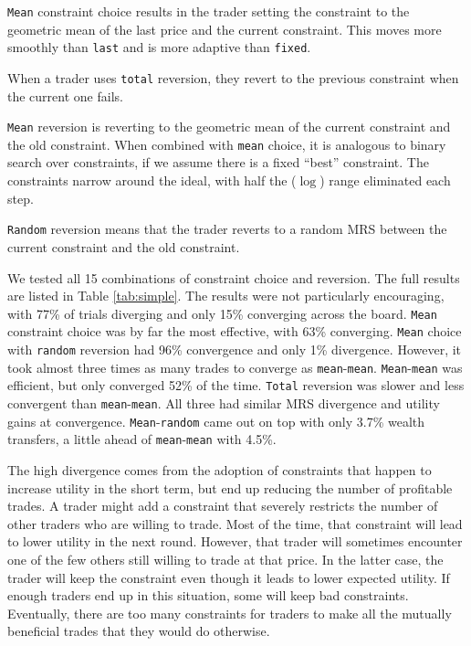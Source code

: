 \documentclass[12pt,a4paper,titlepage]{article}
\newcommand{\co}[1]{\texttt{#1}}
\begin{document}
\co{Mean} constraint choice results in the trader setting the constraint to the geometric mean of the last price and the current constraint.
This moves more smoothly than \co{last} and is more adaptive than \co{fixed}.

When a trader uses \co{total} reversion, they revert to the previous constraint when the current one fails.

\co{Mean} reversion is reverting to the geometric mean of the current constraint and the old constraint.
When combined with \co{mean} choice, it is analogous to binary search over constraints, if we assume there is a fixed ``best'' constraint.
The constraints narrow around the ideal, with half the ($\log$) range eliminated each step.

\co{Random} reversion means that the trader reverts to a random MRS between the current constraint and the old constraint.

We tested all 15 combinations of constraint choice and reversion.
The full results are listed in Table \ref{tab:simple}.
The results were not particularly encouraging, with 77\% of trials diverging and only 15\% converging across the board.
\co{Mean} constraint choice was by far the most effective, with 63\% converging.
\co{Mean} choice with \co{random} reversion had 96\% convergence and only 1\% divergence.
However, it took almost three times as many trades to converge as \co{mean}-\co{mean}.
\co{Mean}-\co{mean} was efficient, but only converged 52\% of the time.
\co{Total} reversion was slower and less convergent than \co{mean}-\co{mean}.
All three had similar MRS divergence and utility gains at convergence.
\co{Mean}-\co{random} came out on top with only 3.7\% wealth transfers, a little ahead of \co{mean}-\co{mean} with 4.5\%.

The high divergence comes from the adoption of constraints that happen to increase utility in the short term, but end up reducing the number of profitable trades.
A trader might add a constraint that severely restricts the number of other traders who are willing to trade.
Most of the time, that constraint will lead to lower utility in the next round.
However, that trader will sometimes encounter one of the few others still willing to trade at that price.
In the latter case, the trader will keep the constraint even though it leads to lower expected utility.
If enough traders end up in this situation, some will keep bad constraints.
Eventually, there are too many constraints for traders to make all the mutually beneficial trades that they would do otherwise.
\end{document}
